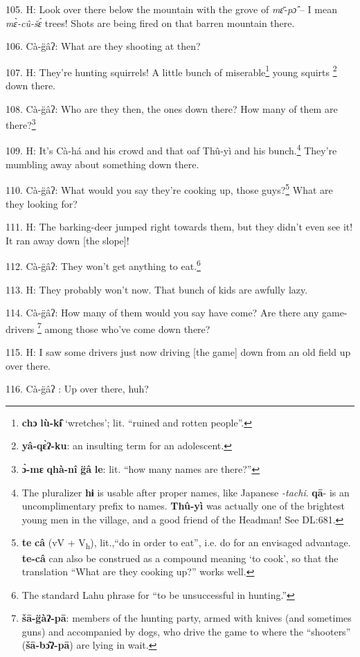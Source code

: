 105. H: Look over there below the mountain with the grove of \textit{mɛ̄-pɔ̂
}-- I mean \textit{mɛ̀-cû-šɛ́} trees! Shots are being fired on that barren
mountain there.

106. Cà-g̈âʔ: What are they shooting at then?

107. H: They're hunting squirrels! A little bunch of miserable\footnote{\textbf{chɔ} \textbf{lù-kɨ̂} `wretches'; lit. ``ruined and rotten people''.} young squirts
\footnote{\textbf{yâ-qɛ̀ʔ-ku}: an insulting term for an adolescent.} down there.

108. Cà-g̈âʔ: Who are they then, the ones down there? How many of them are
there?\footnote{\textbf{ɔ̀-mɛ} \textbf{qhà-nî} \textbf{g̈â} \textbf{le}: lit. ``how many names are there?''}

109. H: It's Cà-há and his crowd and that oaf Thû-yì and his bunch.\footnote{The pluralizer \textbf{hɨ} is usable after proper names, like Japanese \textit{-tachi}. \textbf{qā}- is an uncomplimentary prefix to names. \textbf{Thû-yì} was actually one of the brightest young men in the village, and a good friend of the Headman! See DL:681.} They're
mumbling away about something down there.

110. Cà-g̈âʔ: What would you say they're cooking up, those guys?\footnote{\textbf{te} \textbf{câ} (vV + V\textsubscript{h}), lit.,``do in order to eat'', i.e. do for an envisaged advantage. \textbf{te-câ} can also be construed as a compound meaning `to cook', so that the translation ``What are they cooking up?'' works well.} What
are they looking for?

111. H: The barking-deer jumped right towards them, but they didn't even see it!
It ran away down [the slope]!

112. Cà-g̈âʔ: They won't get anything to eat.\footnote{The standard Lahu phrase for ``to be unsuccessful in hunting.''}

113. H: They probably won't now. That bunch of kids are awfully lazy.

114. Cà-g̈âʔ: How many of them would you say have come? Are there any game-drivers
\footnote{\textbf{šā-g̈àʔ-pā}: members of the hunting party, armed with knives (and sometimes guns) and accompanied by dogs, who drive the game to where the ``shooters'' (\textbf{šā-bɔ̂ʔ-pā}) are lying in wait.} among those who've come down there?

115. H: I saw some drivers just now driving [the game] down from an old field up
over there.

116. Cà-g̈âʔ : Up over there, huh?


